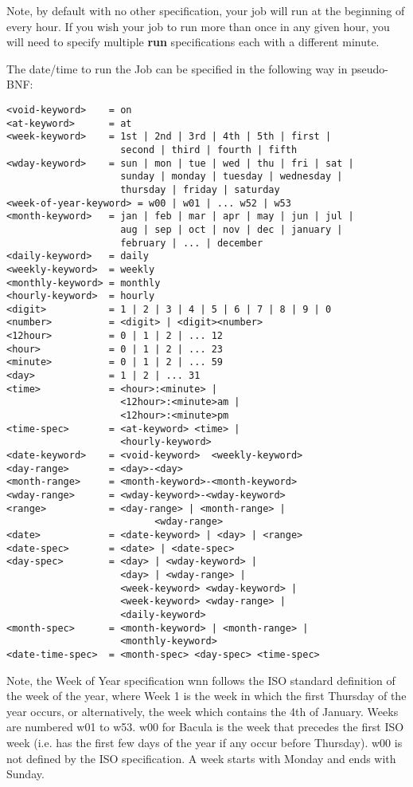\begin{description}
Note, by default with no other specification, your job will run  at the
beginning of every hour. If you wish your job to run more than  once in any
given hour, you will need to specify multiple {\bf run}  specifications each
with a different minute.  

The date/time to run the Job can be specified in the following way  in
pseudo-BNF:  

\footnotesize
\begin{verbatim}
<void-keyword>    = on
<at-keyword>      = at
<week-keyword>    = 1st | 2nd | 3rd | 4th | 5th | first |
                    second | third | fourth | fifth
<wday-keyword>    = sun | mon | tue | wed | thu | fri | sat |
                    sunday | monday | tuesday | wednesday |
                    thursday | friday | saturday
<week-of-year-keyword> = w00 | w01 | ... w52 | w53
<month-keyword>   = jan | feb | mar | apr | may | jun | jul |
                    aug | sep | oct | nov | dec | january |
                    february | ... | december
<daily-keyword>   = daily
<weekly-keyword>  = weekly
<monthly-keyword> = monthly
<hourly-keyword>  = hourly
<digit>           = 1 | 2 | 3 | 4 | 5 | 6 | 7 | 8 | 9 | 0
<number>          = <digit> | <digit><number>
<12hour>          = 0 | 1 | 2 | ... 12
<hour>            = 0 | 1 | 2 | ... 23
<minute>          = 0 | 1 | 2 | ... 59
<day>             = 1 | 2 | ... 31
<time>            = <hour>:<minute> |
                    <12hour>:<minute>am |
                    <12hour>:<minute>pm
<time-spec>       = <at-keyword> <time> |
                    <hourly-keyword>
<date-keyword>    = <void-keyword>  <weekly-keyword>
<day-range>       = <day>-<day>
<month-range>     = <month-keyword>-<month-keyword>
<wday-range>      = <wday-keyword>-<wday-keyword>
<range>           = <day-range> | <month-range> |
                          <wday-range>
<date>            = <date-keyword> | <day> | <range>
<date-spec>       = <date> | <date-spec>
<day-spec>        = <day> | <wday-keyword> |
                    <day> | <wday-range> |
                    <week-keyword> <wday-keyword> |
                    <week-keyword> <wday-range> |
                    <daily-keyword>
<month-spec>      = <month-keyword> | <month-range> |
                    <monthly-keyword>
<date-time-spec>  = <month-spec> <day-spec> <time-spec>
\end{verbatim}
\normalsize

\end{description}

Note, the Week of Year specification wnn follows the ISO standard definition
of the week of the year, where Week 1 is the week in which the first Thursday
of the year occurs, or alternatively, the week which contains the 4th of
January. Weeks are numbered w01 to w53. w00 for Bacula is the week that
precedes the first ISO week (i.e. has the first few days of the year if any
occur before Thursday). w00 is not defined by the ISO specification. A week
starts with Monday and ends with Sunday. 

